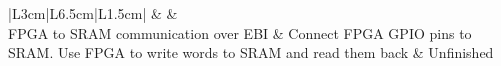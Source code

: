 \documentclass[../main/report.tex]{subfiles}
\begin{document}
\begin{tabular}{|L{3cm}|L{6.5cm}|L{1.5cm}|}
	 &
	 &
	 \\
\hline
	FPGA to SRAM communication over EBI &
	Connect FPGA GPIO pins to SRAM. Use FPGA to write words to SRAM and read them back &
	Unfinished \\
\hline
\end{tabular}
\end{document}

